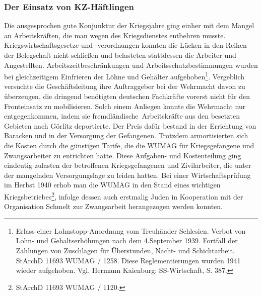 \subsubsection{Der Einsatz von KZ-Häftlingen}
Die ausgesprochen gute Konjunktur der Kriegsjahre ging einher mit dem Mangel an Arbeitskräften, die man wegen des Kriegsdienstes entbehren musste. Kriegswirtschaftsgesetze und \mbox{-verordnungen} konnten die Lücken in den Reihen der Belegschaft nicht schließen und belasteten stattdessen die Arbeiter und Angestellten. Arbeitszeitbeschränkungen und Arbeitsschutzbestimmungen wurden bei gleichzeitigem Einfrieren der Löhne und Gehälter aufgehoben\footnote{Erlass einer Lohnstopp-Anordnung vom Treuhänder Schlesien. Verbot von Lohn- und Gehaltserhöhungen nach dem 4.September 1939. Fortfall der Zahlungen von Zuschlägen für Überstunden, Nacht- und Schichtarbeit. StArchD 11693 WUMAG / 1258. Diese Reglementierungen wurden 1941 wieder aufgehoben. Vgl. Hermann Kaienburg: SS-Wirtschaft, S. 387.}. Vergeblich versuchte die Geschäftsleitung ihre Auftraggeber bei der Wehrmacht davon zu überzeugen, die dringend benötigten deutschen Fachkräfte vorerst nicht für den Fronteinsatz zu mobilisieren. Solch einem Anliegen konnte die Wehrmacht nur entgegenkommen, indem sie \glqq fremdländische\grqq~Arbeitskräfte aus den besetzten Gebieten nach Görlitz deportierte. Der Preis dafür bestand in der Errichtung von Baracken und in der Versorgung der Gefangenen. Trotzdem armortisierten sich die Kosten durch die günstigen Tarife, die die WUMAG für Kriegsgefangene und Zwangsarbeiter zu entrichten hatte. Diese Aufgaben- und Kostenteilung ging eindeutig zulasten der betroffenen Kriegsgefangenen und Zivilarbeiter, die unter der mangelnden Versorgungslage zu leiden hatten.
\newline
Bei einer Wirtschaftsprüfung im Herbst 1940 erhob man die WUMAG in den Stand eines wichtigen Kriegsbetriebes\footnote{StArchD 11693 WUMAG / 1120.}, infolge dessen auch erstmalig Juden in Kooperation mit der Organisation Schmelt zur Zwangsarbeit herangezogen werden konnten.
